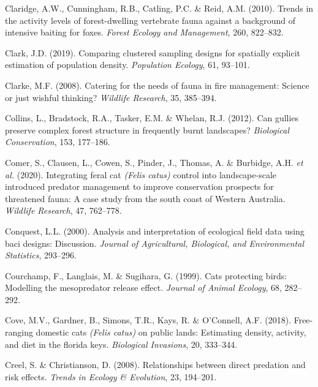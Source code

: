 \documentclass[11pt,a4paper,titlepage,twoside,openright]{style/unimelbthesis}
\begin{document}
\begin{mainmatter}
\leavevmode\hypertarget{ref-claridge2010trends}{}%
Claridge, A.W., Cunningham, R.B., Catling, P.C. \& Reid, A.M. (2010). Trends in the activity levels of forest-dwelling vertebrate fauna against a background of intensive baiting for foxes. \emph{Forest Ecology and Management}, 260, 822--832.

\leavevmode\hypertarget{ref-clark2019comparing}{}%
Clark, J.D. (2019). Comparing clustered sampling designs for spatially explicit estimation of population density. \emph{Population Ecology}, 61, 93--101.

\leavevmode\hypertarget{ref-clarke2008catering}{}%
Clarke, M.F. (2008). Catering for the needs of fauna in fire management: Science or just wishful thinking? \emph{Wildlife Research}, 35, 385--394.

\leavevmode\hypertarget{ref-collins2012can}{}%
Collins, L., Bradstock, R.A., Tasker, E.M. \& Whelan, R.J. (2012). Can gullies preserve complex forest structure in frequently burnt landscapes? \emph{Biological Conservation}, 153, 177--186.

\leavevmode\hypertarget{ref-comer2020integrating}{}%
Comer, S., Clausen, L., Cowen, S., Pinder, J., Thomas, A. \& Burbidge, A.H. \emph{et al.} (2020). Integrating feral cat \emph{(Felis catus)} control into landscape-scale introduced predator management to improve conservation prospects for threatened fauna: A case study from the south coast of Western Australia. \emph{Wildlife Research}, 47, 762--778.

\leavevmode\hypertarget{ref-conquest2000analysis}{}%
Conquest, L.L. (2000). Analysis and interpretation of ecological field data using baci designs: Discussion. \emph{Journal of Agricultural, Biological, and Environmental Statistics}, 293--296.

\leavevmode\hypertarget{ref-courchamp1999cats}{}%
Courchamp, F., Langlais, M. \& Sugihara, G. (1999). Cats protecting birds: Modelling the mesopredator release effect. \emph{Journal of Animal Ecology}, 68, 282--292.

\leavevmode\hypertarget{ref-cove2018free}{}%
Cove, M.V., Gardner, B., Simons, T.R., Kays, R. \& O'Connell, A.F. (2018). Free-ranging domestic cats \emph{(Felis catus)} on public lands: Estimating density, activity, and diet in the florida keys. \emph{Biological Invasions}, 20, 333--344.

\leavevmode\hypertarget{ref-creel2008relationships}{}%
Creel, S. \& Christianson, D. (2008). Relationships between direct predation and risk effects. \emph{Trends in Ecology \& Evolution}, 23, 194--201.


\end{mainmatter}
\end{document}

